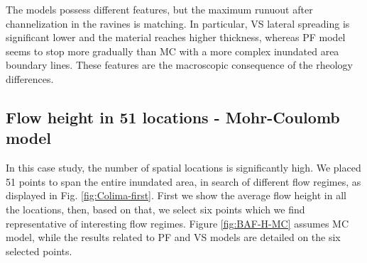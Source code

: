 \documentclass{article}
\begin{document}

The models possess different features, but the maximum runuout after channelization in the ravines is matching. In particular, VS lateral spreading is significant lower and the material reaches higher thickness, whereas PF model seems to stop more gradually than MC with a more complex inundated area boundary lines. These features are the macroscopic consequence of the rheology differences.

\subsection{Flow height in 51 locations - Mohr-Coulomb model}
In this case study, the number of spatial locations is significantly high. We placed 51 points to span the entire inundated area, in search of different flow regimes, as displayed in Fig. \ref{fig:Colima-first}. First we show the average flow height in all the locations, then, based on that, we select six points which we find representative of interesting flow regimes. Figure \ref{fig:BAF-H-MC} assumes MC model, while the results related to PF and VS models are detailed on the six selected points.
\end{document}
